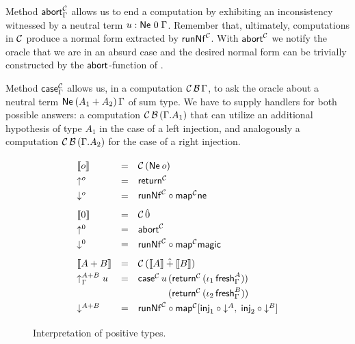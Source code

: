 \documentclass[sigconf,screen,fleqn]{acmart} %
\begin{document}
Method $\tabort^\C_\Gamma$ allows us to end a computation by exhibiting an
inconsistency witnessed by a neutral term $u : \Ne 0 \Gamma$.
Remember that, ultimately, computations in $\C$ produce a normal form
extracted by $\trunNf[\C]$.  With $\tabort^\C$ we notify the oracle
that we are in an absurd case and the desired normal form can be
trivially constructed by the $\tabort$-function of .

Method $\tcase^\C_\Gamma$ allows us, in a computation
$\C\,\B\,\Gamma$,
to ask the oracle about a neutral
term $\NeP{A_1 + A_2}\Gamma$ of sum type.  We have to supply
handlers for both possible answers:
a computation $\C\,\B\,(\cext\Gamma{A_1})$ that can utilize an
additional hypothesis of type $A_1$ in the case of a left injection,
and analogously a computation $\C\,\B\,(\cext\Gamma{A_2})$ for the
case of a right injection.
\newcommand{\figdenpos}{
\begin{figure}[bthp]
\hrulefill
\[
\def\arraystretch{1.3}
\begin{array}{lcl}
  \den   \tybase & = & \C\,(\tNe\,\tybase) \\
  \up    \tybase & = & \treturn[\C] \\
  \down  \tybase & = & \trunNf[\C] \comp \tmap[\C]\tne \\[1ex]
  \den   \tyzero & = & \C\,\hat0 \\
  \up    \tyzero & = & \tabort^\C \\
  \down  \tyzero & = & \trunNf[\C] \comp \tmap[\C]\tmagic \\[1ex]
  \den {A+B} & = & \C\,(\den A \hatplus \den B) \\
  \upG {A+B} \; u & = & \tcase^\C\,u
    \,(\treturn[\C]\,(\iota_1\,\tfresh^A_\Gamma)) \\ & & \qquad\quad
    \,(\treturn[\C]\,(\iota_2\,\tfresh^B_\Gamma))
    \\
  \down {A+B} & = & \trunNf[\C] \comp
    \tmap[\C] [\tinj_1 \comp \down A,\; \tinj_2 \comp \down B] \\
\end{array}
\]
\hrulefill
  \caption{Interpretation of positive types.}
  \label{fig:denpos}
\end{figure}
} %
\figdenpos
\end{document}

